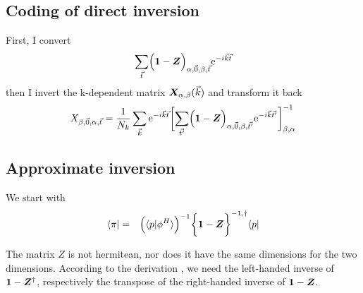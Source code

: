 \documentclass[11pt,a4paper]{report}
\begin{document}
\subsection{Coding of direct inversion}
First, I convert 
\begin{eqnarray}
\sum_{\vec{t}}
\Bigl(\bm{1}-\bm{Z}\Bigr)_{\alpha,\vec{0},\beta,\vec{t}}
\mathrm{e}^{-i\vec{k}\vec{t}}
\end{eqnarray}
then I invert the k-dependent matrix $\bm{X}_{\alpha,\beta}(\vec{k})$
and transform it back
\begin{eqnarray}
X_{\beta,\vec{0},\alpha,\vec{t}}=
\frac{1}{N_k}\sum_{\vec{k}}
\mathrm{e}^{-i\vec{k}\vec{t}}
\biggl[
\sum_{\vec{t'}}
\Bigl(\bm{1}-\bm{Z}\Bigr)_{\alpha,\vec{0},\beta,\vec{t'}}
\mathrm{e}^{-i\vec{k}\vec{t'}}
\biggr]^{-1}_{\beta,\alpha}
\end{eqnarray}





\subsection{Approximate inversion}
We start with 
\begin{eqnarray}
\langle\pi|&=&
\Bigl(\langle{p}|\phi^H\rangle\Bigr)^{-1}
\biggl\lbrace
\bm{1}-\bm{Z}
\biggr\rbrace^{-1,\dagger}
\langle{p}|
\end{eqnarray}

The matrix $Z$ is not hermitean, nor does it have the same dimensions
for the two dimensions. According to the derivation
, we need the left-handed inverse of
$\bm{1}-\bm{Z}^\dagger$, respectively the transpose of the
right-handed inverse of $\bm{1}-\bm{Z}$.
\end{document}
